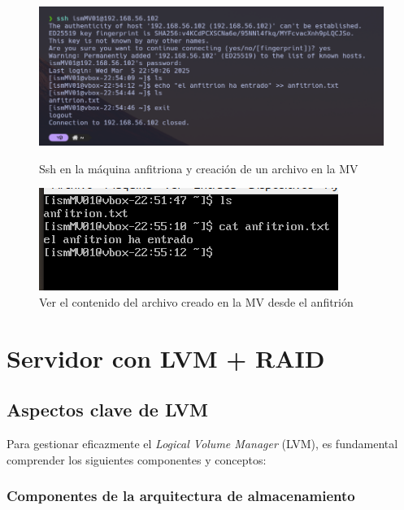 \begin{figure}[htbp]
    \centering
    \begin{minipage}[b]{0.45\textwidth}
        \centering
        \includegraphics[width=\textwidth]{images/Bloque1/ssh1.png}
        \caption{Ssh en la máquina anfitriona y creación de un archivo en la MV}
    \end{minipage}
    \hfill
    \begin{minipage}[b]{0.45\textwidth}
        \centering
        \includegraphics[width=\textwidth]{images/Bloque1/ssh2.png}
        \caption{Ver el contenido del archivo creado en la MV desde el anfitrión}
    \end{minipage}
\end{figure}

\section{Servidor con LVM + RAID}

\subsection{Aspectos clave de LVM}

Para gestionar eficazmente el \textit{Logical Volume Manager} (LVM), es fundamental comprender los siguientes componentes y conceptos:

\subsubsection{Componentes de la arquitectura de almacenamiento}

